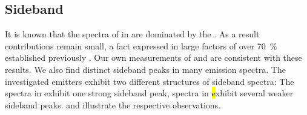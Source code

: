 
	\subsection{Sideband} \label{subsubsec::sideband}

		It is known that the \pl spectra of \sivs in \nd are dominated by the \zpl. As a result \psb contributions remain small, a fact expressed in large \db factors of over \SI{70}{\percent} established previously \cite{Neu2011,Neu2011b}. Our own measurements of \emnarrow and \embroad are consistent with these results. We also find distinct sideband peaks in many \siv \pl emission spectra.
		The investigated emitters exhibit two different structures of sideband spectra: The spectra in \vl exhibit one strong sideband peak, spectra in \hl exhibit several weaker sideband peaks.  and  illustrate the respective observations.

